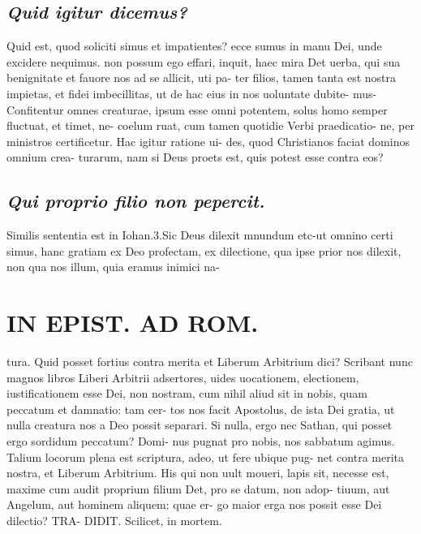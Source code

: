 \documentclass{article}
\begin{document}
\begin{pages}
\subsection*{\textit{Quid igitur dicemus? }}\pstart Quid est, quod soliciti simus et impatientes? ecce sumus in manu Dei, unde excidere nequimus. non possum ego effari, inquit, haec mira Det uerba, qui sua benignitate et fauore nos ad se allicit, uti pa- ter filios, tamen tanta est nostra impietas, et fidei imbecillitas, ut de hac eius in nos uoluntate dubite- mus-Confitentur omnes creaturae, ipsum esse omni potentem, solus homo semper fluctuat, et timet, ne- coelum ruat, cum tamen quotidie Verbi praedicatio- ne, per ministros certificetur. Hac igitur ratione ui- des, quod Christianos faciat dominos omnium crea- turarum, nam si Deus proets est, quis potest esse contra eos?  \pend
{}
{}
\subsection*{\textit{Qui proprio filio non pepercit. }}\pstart Similis sententia est in Iohan.3.Sic Deus dilexit mnundum etc-ut omnino certi simus, hanc gratiam ex Deo profectam, ex dilectione, qua ipse prior nos dilexit, non qua nos illum, quia eramus inimici na-  \pend
\section*{IN EPIST. AD ROM.  }
\marginpar{[ p.103 ]}\pstart tura. Quid posset fortius contra merita et Liberum Arbitrium dici? Scribant nunc magnos libros Liberi Arbitrii adsertores, uides uocationem, electionem, iustificationem esse Dei, non nostram, cum nihil aliud sit in nobis, quam peccatum et damnatio: tam cer- tos nos facit Apostolus, de ista Dei gratia, ut nulla creatura nos a Deo possit separari. Si nulla, ergo nec Sathan, qui posset ergo sordidum peccatum? Domi- nus pugnat pro nobis, nos sabbatum agimus. Talium locorum plena est scriptura, adeo, ut fere ubique pug- net contra merita nostra, et Liberum Arbitrium. His qui non uult moueri, lapis sit, necesse est, maxime cum audit proprium filium Det, pro se datum, non adop- tiuum, aut Angelum, aut hominem aliquem: quae er- go maior erga nos possit esse Dei dilectio? TRA- DIDIT. Scilicet, in mortem.   \pend
{}
{}

\end{pages}
\end{document}
